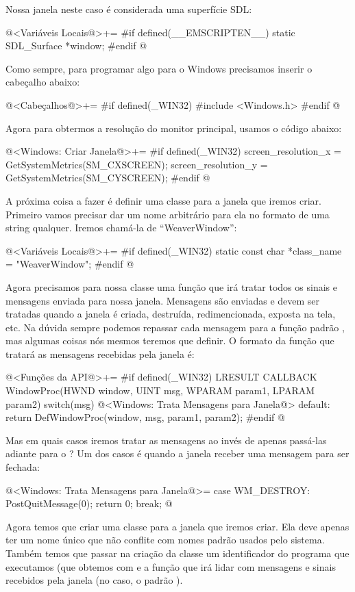 Nossa janela neste caso é considerada uma superfície SDL:

\iniciocodigo
@<Variáveis Locais@>+=
#if defined(__EMSCRIPTEN__)
static SDL_Surface *window;
#endif
@
\fimcodigo


Como sempre, para programar algo para o Windows precisamos inserir o
cabeçalho abaixo:

\iniciocodigo
@<Cabeçalhos@>+=
#if defined(_WIN32)
#include <Windows.h>
#endif
@
\fimcodigo

Agora para obtermos a resolução do monitor principal, usamos o código
abaixo:

\iniciocodigo
@<Windows: Criar Janela@>+=
#if defined(_WIN32)
screen_resolution_x = GetSystemMetrics(SM_CXSCREEN);
screen_resolution_y = GetSystemMetrics(SM_CYSCREEN);
#endif
@
\fimcodigo

A próxima coisa a fazer é definir uma classe para a janela que iremos
criar. Primeiro vamos precisar dar um nome arbitrário para ela no
formato de uma string qualquer. Iremos chamá-la de ``WeaverWindow'':

\iniciocodigo
@<Variáveis Locais@>+=
#if defined(_WIN32)
static const char *class_name = "WeaverWindow";
#endif
@
\fimcodigo

Agora precisamos para nossa classe uma função que irá tratar todos os
sinais e mensagens enviada para nossa janela. Mensagens são enviadas e
devem ser tratadas quando a janela é criada, destruída,
redimencionada, exposta na tela, etc. Na dúvida sempre podemos
repassar cada mensagem para a função
padrão , mas algumas coisas nós mesmos
teremos que definir. O formato da função que tratará as mensagens
recebidas pela janela é:

\iniciocodigo
@<Funções da API@>+=
#if defined(_WIN32)
LRESULT CALLBACK WindowProc(HWND window, UINT msg, WPARAM param1, LPARAM param2){
  switch(msg){
    @<Windows: Trata Mensagens para Janela@>
    default:
      return DefWindowProc(window, msg, param1, param2);
  }
}
#endif
@
\fimcodigo

Mas em quais casos iremos tratar as mensagens ao invés de apenas
passá-las adiante para o ? Um dos casos é
quando a janela receber uma mensagem para ser fechada:

\iniciocodigo
@<Windows: Trata Mensagens para Janela@>=
case WM_DESTROY:
  PostQuitMessage(0);
  return 0;
  break;
@
\fimcodigo

Agora temos que criar uma classe para a janela que iremos criar. Ela
deve apenas ter um nome único que não conflite com nomes padrão usados
pelo sistema. Também temos que passar na criação da classe um
identificador do programa que executamos (que obtemos
com  e a função que irá lidar com
mensagens e sinais recebidos pela janela (no
caso, o padrão ).

